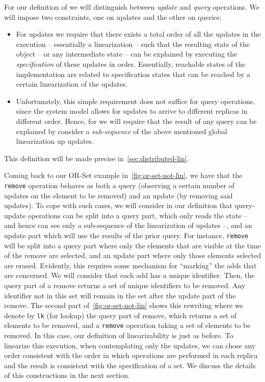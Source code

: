 For our definition of \CRDTLinshort{} we will distinguish between
\emph{update} and \emph{query} operations.
%
We will impose two constraints, one on updates and the other on
queries:
\begin{itemize}
\item For updates we require that there exists a total order of all
  the updates in the execution -- essentially a linearization -- such
  that the resulting state of the object -- or any intermediate state --
  can be explained by executing the \emph{specification} of these
  updates in order.
%
  Essentially, reachable states of the implementation are related to
  specification states that can be reached by a certain linearization of
  the updates.
%
\item Unfortunately, this simple requirement does not suffice for
  query operations, since the system model allows for updates to arrive
  to different replicas in different order.
%
  Hence, for \CRDTLinshort{} we will require that the result of any
  query can be explained by consider a \emph{sub-sequence} of the above
  mentioned global linearization up updates.
\end{itemize}
This definition will be made precise in~\autoref{sec:distributed-lin}.

Coming back to our OR-Set example in~\autoref{fig:or-set-not-lin}, we
have that the \lstinline|remove| operation behaves as both a query
(observing a certain number of updates on the element to be removed)
and an update (by removing said updates).
%
To cope with such cases, we will consider in our definition that
query-update operations can be split into a query part, which only
reads the state -- and hence can see only a sub-sequence of the
linearization of updates --, and an update part which will use the
results of the prior query.
%
For instance, \lstinline|remove| will be split into a query part where
only the elements that are visible at the time of the remove are
selected, and an update part where only those elements selected are
erased.
%
Evidently, this requires some mechanism for ``marking'' the adds that
are concerned.
%
We will consider that each add has a unique identifier.
%
Then, the query part of a remove returns a set of unique identifiers
to be removed.
%
Any identifier not in this set will remain in the set after the update
part of the remove.
%
The second part of~\autoref{fig:or-set-not-lin} shows this rewriting
where we denote by \lstinline|lk| (for lookup) the query part of
remove, which returns a set of elements to be removed, and a
\lstinline|remove| operation taking a set of elements to be removed.
%
In this case, our definition of linearizability is just as before.
%
To linearize this execution, when contemplating only the updates, we
can chose any order consistent with the order in which operations are
performed in each replica and the result is consistent with the
specification of a set.
%
We discuss the details of this constructions in the next section.


